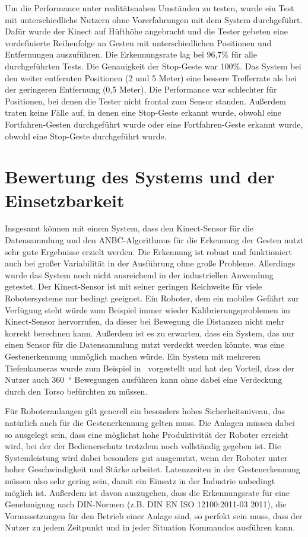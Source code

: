 Um die Performance unter realitätsnahen Umständen zu testen, wurde ein Test mit unterschiedliche Nutzern ohne Vorerfahrungen mit dem System durchgeführt. Dafür wurde der Kinect auf Hüfthöhe angebracht und die Tester gebeten eine vordefinierte Reihenfolge an Gesten mit unterschiedlichen Positionen und Entfernungen auszuführen. Die Erkennungsrate lag bei 96,7\% für alle durchgeführten Tests. Die Genauigkeit der Stop-Geste war 100\%. Das System bei den weiter entfernten Positionen (2 und 5 Meter) eine bessere Trefferrate als bei der geringeren Entfernung (0,5 Meter). Die Performance war schlechter für Positionen, bei denen die Tester nicht frontal zum Sensor standen. Außerdem traten keine Fälle auf, in denen eine Stop-Geste erkannt wurde, obwohl eine Fortfahren-Gesten durchgeführt wurde oder eine Fortfahren-Geste erkannt wurde, obwohl eine Stop-Geste durchgeführt wurde.~\cite{flexibleSystem}

\section{Bewertung des Systems und der Einsetzbarkeit}
Insgesamt können mit einem System, dass den Kinect-Sensor für die Datensammlung und den ANBC-Algorithmus für die Erkennung der Gesten nutzt sehr gute Ergebnisse erzielt werden. Die Erkennung ist robust und funktioniert auch bei großer Variabilität in der Ausführung ohne große Probleme. Allerdings wurde das System noch nicht ausreichend in der industriellen Anwendung getestet. Der Kinect-Sensor ist mit seiner geringen Reichweite für viele Robotersysteme nur bedingt geeignet. Ein Roboter, dem ein mobiles Gefährt zur Verfügung steht würde zum Beispiel immer wieder Kalibrierungsproblemen im Kinect-Sensor hervorrufen, da dieser bei Bewegung die Distanzen nicht mehr korrekt berechnen kann. Außerdem ist es zu erwarten, dass ein System, das nur einen Sensor für die Datensammlung nutzt verdeckt werden könnte, was eine Gestenerkennung unmöglich machen würde. Ein System mit mehreren Tiefenkameras wurde zum Beispiel in~\cite{multipleDepthCameras} vorgestellt und hat den Vorteil, dass der Nutzer auch \SI{360}{\degree} Bewegungen ausführen kann ohne dabei eine Verdeckung durch den Torso befürchten zu müssen.

Für Roboteranlangen gilt generell ein besonders hohes Sicherheitsniveau, das natürlich auch für die Gestenerkennung gelten muss. Die Anlagen müssen dabei so ausgelegt sein, dass eine möglichst hohe Produktivität der Roboter erreicht wird, bei der der Bedienerschutz trotzdem noch vollständig gegeben ist. Die Systemleistung wird dabei besonders gut ausgenutzt, wenn der Roboter unter hoher Geschwindigkeit und Stärke arbeitet. Latenzzeiten in der Gestenerkennung müssen also sehr gering sein, damit ein Einsatz in der Industrie unbedingt möglich ist. Außerdem ist davon auszugehen, dass die Erkennungsrate für eine Genehmigung nach DIN-Normen (z.B. DIN EN ISO 12100:2011-03 2011), die Voraussetzungen für den Betrieb einer Anlage sind, so perfekt sein muss, dass der Nutzer zu jedem Zeitpunkt und in jeder Situation Kommandos ausführen kann.~\cite{ObererTreitz.2019}
